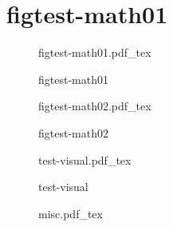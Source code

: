 \documentclass{article}
\newcommand{\incfig}[2][1]{%
	\def\svgwidth{#1\columnwidth}
	{#2.pdf_tex}
}
\begin{document}
\section{ figtest-math01}

\begin{figure}[ht]
	\centering
	\incfig{figtest-math01}
	\caption{figtest-math01}
	\label{fig:figtest-math01}
\end{figure}

\begin{figure}[ht]
	\centering
	\incfig{figtest-math02}
	\caption{figtest-math02}
	\label{fig:figtest-math02}
\end{figure}

\begin{figure}[ht]
	\centering
	\incfig{test-visual}
	\caption{test-visual}
	\label{fig:test-visual}
\end{figure}

\begin{figure}[htpb]
  \centering
  \incfig{misc}
  \caption{}
  \label{fig:}
\end{figure}
\end{document}
